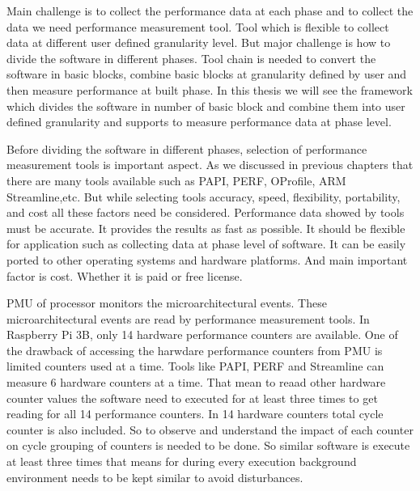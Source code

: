 \par Main challenge is to collect the performance data at each phase and to collect the data we need performance measurement tool. Tool which is flexible to collect data at different user defined granularity level. But major challenge is how to divide the software in different phases. Tool chain is needed to convert the software in basic blocks, combine basic blocks at granularity defined by user and then measure performance at built phase. In this thesis we will see the framework which divides the software in number of basic block and combine them into user defined granularity and supports to measure performance data at phase level. 

\par Before dividing the software in different phases, selection of performance measurement tools is important aspect. As we discussed in previous chapters that there are many tools available such as PAPI, PERF, OProfile, ARM Streamline,etc. But while selecting tools accuracy, speed, flexibility, portability, and cost all these factors need be considered. Performance data showed by tools must be accurate. It provides the results as fast as possible. It should be flexible for application such as collecting data at phase level of software. It can be easily ported to other operating systems and hardware platforms. And main important factor is cost. Whether it is paid or free license. 

\par PMU of processor monitors the microarchitectural events. These microarchitectural events are read by performance measurement tools. In Raspberry Pi 3B, only 14 hardware performance counters are available. One of the drawback of accessing the harwdare performance counters from PMU is limited counters used at a time. Tools like PAPI, PERF and Streamline can measure 6 hardware counters at a time. That mean to reaad other hardware counter values the software need to executed for at least three times to get reading for all 14 performance counters. In 14 hardware counters total cycle counter is also included. So to observe and understand the impact of each counter on cycle grouping of counters is needed to be done. So similar software is execute at least three times that means for during every execution background environment needs to be kept similar to avoid disturbances. 

\par 



